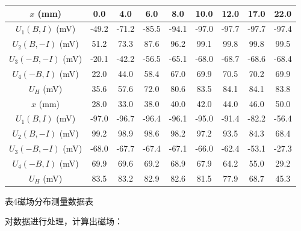 \documentclass[UTF8]{ctexart}
\begin{document}
\begin{center}
    \begin{tabular}{|c|c|c|c|c|c|c|c|c|}
        \hline
        $x$ (mm) & 0.0 & 4.0 & 6.0 & 8.0 & 10.0 & 12.0 & 17.0 & 22.0 \\\hline
        $U_1(B,I)$ (mV) & -49.2 & -71.2 & -85.5 & -94.1 & -97.0 & -97.7 & -97.7 & -97.4 \\\hline
        $U_2(B,-I)$ (mV) & 51.2 & 73.3 & 87.6 & 96.2 & 99.1 & 99.8 & 99.8 & 99.5 \\\hline
        $U_3(-B,-I)$ (mV) & -20.1 & -42.2 & -56.5 & -65.1 & -68.0 & -68.7 & -68.6 & -68.4 \\\hline
        $U_4(-B,I)$ (mV) & 22.0 & 44.0 & 58.4 & 67.0 & 69.9 & 70.5 & 70.2 & 69.9 \\\hline
        $U_H$ (mV) & 35.6 & 57.6 & 72.0 & 80.6 & 83.5 & 84.1 & 84.1 & 83.8 \\\hline
        \hline
        $x$ (mm) & 28.0 & 33.0 & 38.0 & 40.0 & 42.0 & 44.0 & 46.0 & 50.0\\\hline
        $U_1(B,I)$ (mV) & -97.0 & -96.7 & -96.4 & -96.1 & -95.0 & -91.4 & -82.2 & -56.4 \\\hline
        $U_2(B,-I)$ (mV) & 99.2 & 98.9 & 98.6 & 98.2 & 97.2 & 93.5 & 84.3 & 68.4 \\\hline
        $U_3(-B,-I)$ (mV) & -68.0 & -67.7 & -67.4 & -67.1 & -66.0 & -62.4 & -53.1 & -27.3 \\\hline
        $U_4(-B,I)$ (mV) & 69.9 & 69.6 & 69.2 & 68.9 & 67.9 & 64.2 & 55.0 & 29.2 \\\hline
        $U_H$ (mV) & 83.5 & 83.2 & 82.9 & 82.6 & 81.5 & 77.9 & 68.7 & 45.3 \\\hline
    \end{tabular}
    \begin{minipage}{0.8\textwidth}
        \centering
        \fontsize{9pt}{\baselineskip}\selectfont
        表4\quad 磁场分布测量数据表
    \end{minipage}
    \label{Hall_voltage_distribution_data}
\end{center}

对数据进行处理，计算出磁场：
\end{document}
